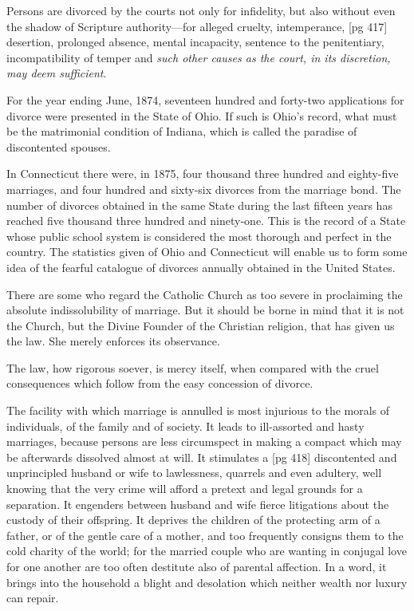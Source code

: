 Persons are divorced by the courts not only for
infidelity, but also without even the shadow of
Scripture authority—for alleged cruelty, intemperance,
[pg 417]
desertion, prolonged absence, mental incapacity,
sentence to the penitentiary, incompatibility
of temper and \emph{such other causes as the
court, in its discretion, may deem sufficient}.

For the year ending June, 1874, seventeen hundred
and forty-two applications for divorce were
presented in the State of Ohio. If such is Ohio's
record, what must be the matrimonial condition
of Indiana, which is called the paradise of discontented
spouses.

In Connecticut there were, in 1875, four thousand
three hundred and eighty-five marriages, and
four hundred and sixty-six divorces from the marriage
bond. The number of divorces obtained in
the same State during the last fifteen years has
reached five thousand three hundred and ninety-one.
This is the record of a State whose public
school system is considered the most thorough
and perfect in the country. The statistics given
of Ohio and Connecticut will enable us to form
some idea of the fearful catalogue of divorces
annually obtained in the United States.

There are some who regard the Catholic Church
as too severe in proclaiming the absolute indissolubility
of marriage. But it should be borne
in mind that it is not the Church, but the Divine
Founder of the Christian religion, that has given
us the law. She merely enforces its observance.

The law, how rigorous soever, is mercy itself,
when compared with the cruel consequences
which follow from the easy concession of divorce.

The facility with which marriage is annulled
is most injurious to the morals of individuals, of
the family and of society. It leads to ill-assorted
and hasty marriages, because persons are less circumspect
in making a compact which may be afterwards
dissolved almost at will. It stimulates a
[pg 418]
discontented and unprincipled husband or wife
to lawlessness, quarrels and even adultery, well
knowing that the very crime will afford a pretext
and legal grounds for a separation. It engenders
between husband and wife fierce litigations
about the custody of their offspring. It
deprives the children of the protecting arm of a
father, or of the gentle care of a mother, and
too frequently consigns them to the cold charity
of the world; for the married couple who are
wanting in conjugal love for one another are
too often destitute also of parental affection. In
a word, it brings into the household a blight and
desolation which neither wealth nor luxury can
repair.

